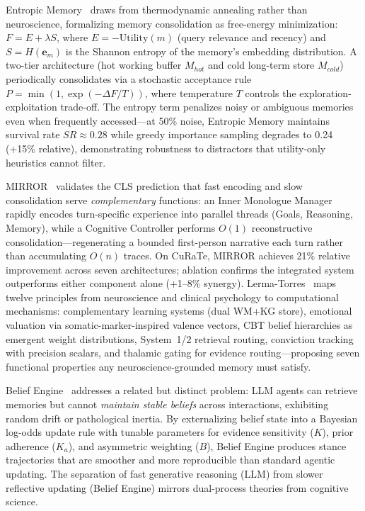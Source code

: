 \documentclass[hf]{ceurart}
\begin{document}
Entropic Memory~\cite{entropicmem2026} draws from thermodynamic
annealing rather than neuroscience, formalizing memory consolidation
as free-energy minimization: $F = E + \lambda S$, where $E =
-\text{Utility}(m)$ (query relevance and recency) and $S = H(\mathbf{e}_m)$
is the Shannon entropy of the memory's embedding distribution.
A two-tier architecture (hot working buffer $M_{hot}$ and cold
long-term store $M_{cold}$) periodically consolidates via a stochastic
acceptance rule $P = \min(1, \exp(-\Delta F / T))$, where temperature
$T$ controls the exploration-exploitation trade-off. The entropy
term penalizes noisy or ambiguous memories even when frequently
accessed---at 50\% noise, Entropic Memory maintains survival rate
$SR \approx 0.28$ while greedy importance sampling degrades to 0.24
(+15\% relative), demonstrating robustness to distractors that
utility-only heuristics cannot filter.

MIRROR~\cite{mirror2026} validates the CLS prediction that fast
encoding and slow consolidation serve \emph{complementary} functions:
an Inner Monologue Manager rapidly encodes turn-specific experience
into parallel threads (Goals, Reasoning, Memory), while a Cognitive
Controller performs $O(1)$ reconstructive consolidation---regenerating
a bounded first-person narrative each turn rather than accumulating
$O(n)$ traces. On CuRaTe, MIRROR achieves 21\% relative improvement
across seven architectures; ablation confirms the integrated system
outperforms either component alone (+1--8\% synergy).
Lerma-Torres~\cite{humanlifelike2026} maps twelve principles from
neuroscience and clinical psychology to computational mechanisms:
complementary learning systems (dual WM+KG store), emotional
valuation via somatic-marker-inspired valence vectors, CBT belief
hierarchies as emergent weight distributions, System~1/2 retrieval
routing, conviction tracking with precision scalars, and thalamic
gating for evidence routing---proposing seven functional properties
any neuroscience-grounded memory must satisfy.

Belief Engine~\cite{beliefengine2026} addresses a related but distinct
problem: LLM agents can retrieve memories but cannot \emph{maintain
stable beliefs} across interactions, exhibiting random drift or
pathological inertia. By externalizing belief state into a Bayesian
log-odds update rule with tunable parameters for evidence sensitivity
($K$), prior adherence ($K_a$), and asymmetric weighting ($B$), Belief
Engine produces stance trajectories that are smoother and more
reproducible than standard agentic updating. The separation of fast
generative reasoning (LLM) from slower reflective updating (Belief
Engine) mirrors dual-process theories from cognitive science.
\end{document}
